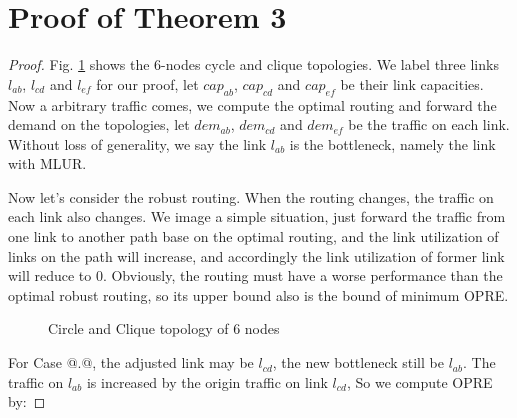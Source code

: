\documentclass[conference]{IEEEtran}
\makeatletter
\newcommand{\Rmnum}[1]{\expandafter\@slowromancap\romannumeral #1@}
\makeatother
\begin{document}
\section{Proof of Theorem 3}
\begin{proof}
Fig. \ref{figure_circle_and_clique} shows the 6-nodes cycle and clique topologies. We label three links $l_{ab}$, $l_{cd}$ and $l_{ef}$
for our proof, let $cap_{ab}$, $cap_{cd}$ and $cap_{ef}$ be their link capacities. Now a arbitrary traffic
comes, we compute the optimal routing and forward the demand on the topologies, let $dem_{ab}$, $dem_{cd}$
and $dem_{ef}$ be the traffic on each link. Without loss of generality, we say the link $l_{ab}$ is the
bottleneck, namely the link with MLUR.


Now let's consider the robust routing. When the routing changes, the traffic on each link also changes.
We image a simple situation, just forward the traffic from one link to another path base on the optimal
routing, and the link utilization of links on the path will increase, and accordingly the link
utilization of former link will reduce to 0. Obviously, the routing must have a worse performance than
the optimal robust routing, so its upper bound also is the bound of minimum OPRE.


\begin{figure}[!t]
\centering
\vspace*{0.1in}
\hfill
{}
\caption{Circle and Clique topology of 6 nodes}
\label{figure_circle_and_clique}
\vspace*{0.1in}
\end{figure}

For Case \Rmnum{1}.\Rmnum{1}, the adjusted link may be $l_{cd}$, the new bottleneck still be $l_{ab}$.
The traffic on $l_{ab}$ is increased by the origin traffic on link $l_{cd}$, So we compute OPRE by:


\end{proof}
\end{document}
